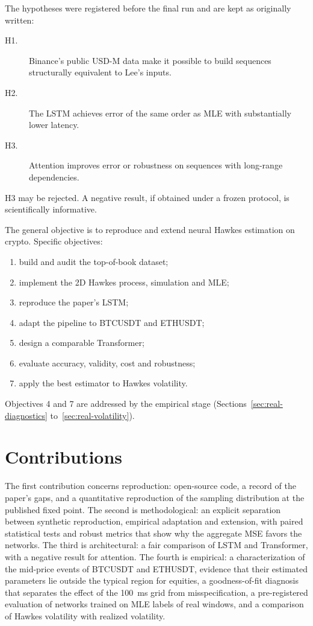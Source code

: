The hypotheses were registered before the final run and are kept as originally
written:

\begin{description}
  \item[H1.] Binance's public USD-M data make it possible to build sequences
  structurally equivalent to Lee's inputs.
  \item[H2.] The LSTM achieves error of the same order as MLE with substantially lower
  latency.
  \item[H3.] Attention improves error or robustness on sequences with long-range
  dependencies.
\end{description}

H3 may be rejected. A negative result, if obtained under a frozen protocol, is
scientifically informative.

The general objective is to reproduce and extend neural Hawkes estimation on crypto.
Specific objectives:
\begin{enumerate}
  \item build and audit the top-of-book dataset;
  \item implement the 2D Hawkes process, simulation and MLE;
  \item reproduce the paper's LSTM;
  \item adapt the pipeline to BTCUSDT and ETHUSDT;
  \item design a comparable Transformer;
  \item evaluate accuracy, validity, cost and robustness;
  \item apply the best estimator to Hawkes volatility.
\end{enumerate}
Objectives 4 and 7 are addressed by the empirical stage
(Sections~\ref{sec:real-diagnostics} to~\ref{sec:real-volatility}).

\section{Contributions}

The first contribution concerns reproduction: open-source code, a record of the
paper's gaps, and a quantitative reproduction of the sampling distribution at the
published fixed point. The second is methodological: an explicit separation between
synthetic reproduction, empirical adaptation and extension, with paired statistical
tests and robust metrics that show why the aggregate MSE favors the networks. The
third is architectural: a fair comparison of LSTM and Transformer, with a negative
result for attention. The fourth is empirical: a characterization of the mid-price
events of BTCUSDT and ETHUSDT, evidence that their estimated parameters lie outside
the typical region for equities, a goodness-of-fit diagnosis that separates the effect of
the 100~ms grid from misspecification, a pre-registered evaluation of networks trained on
MLE labels of real windows, and a comparison of Hawkes volatility with realized volatility.
